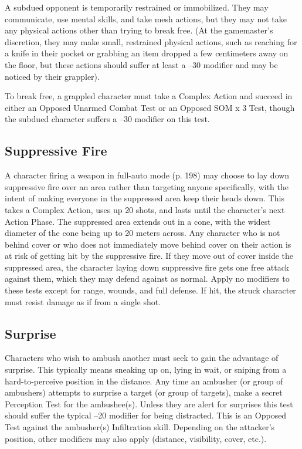 A subdued opponent is temporarily restrained or 
immobilized. They may communicate, use mental 
skills, and take mesh actions, but they may not take 
any physical actions other than trying to break free. 
(At the gamemaster's discretion, they may make small, 
restrained physical actions, such as reaching for a 
knife in their pocket or grabbing an item dropped a 
few centimeters away on the floor, but these actions 
should suffer at least a –30 modifier and may be noticed
by their grappler).

To break free, a grappled character must take a 
Complex Action and succeed in either an Opposed 
Unarmed Combat Test or an Opposed SOM x 3 Test, 
though the subdued character suffers a –30 modifier 
on this test.

\subsection{Suppressive Fire}

A character firing a weapon in full-auto mode (p. 198) 
may choose to lay down suppressive fire over an area 
rather than targeting anyone specifically, with the 
intent of making everyone in the suppressed area keep 
their heads down. This takes a Complex Action, uses 
up 20 shots, and lasts until the character's next Action 
Phase. The suppressed area extends out in a cone, with 
the widest diameter of the cone being up to 20 meters 
across. Any character who is not behind cover or who 
does not immediately move behind cover on their 
action is at risk of getting hit by the suppressive fire. If 
they move out of cover inside the suppressed area, the 
character laying down suppressive fire gets one free 
attack against them, which they may defend against 
as normal. Apply no modifiers to these tests except 
for range, wounds, and full defense. If hit, the struck 
character must resist damage as if from a single shot.

\subsection{Surprise}

Characters who wish to ambush another must seek to 
gain the advantage of surprise. This typically means 
sneaking up on, lying in wait, or sniping from a hard-to-perceive
position in the distance. Any time an ambusher
(or group of ambushers) attempts to surprise a
target (or group of targets), make a secret Perception 
Test for the ambushee(s). Unless they are alert for surprises
this test should suffer the typical –20 modifier
for being distracted. This is an Opposed Test against 
the ambusher(s) Infiltration skill. Depending on the 
attacker's position, other modifiers may also apply 
(distance, visibility, cover, etc.).

